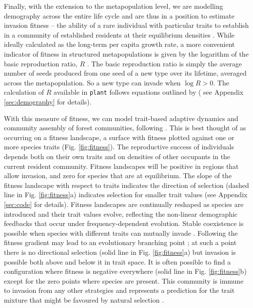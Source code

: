 \documentclass[a4paper,11pt]{article}
\newcommand{\plant}{\texttt{plant}}
\begin{document}
Finally, with the extension to the metapopulation level, we are
modelling demography across the entire life cycle and are thus in a
position to estimate invasion fitness -- the ability of a rare
individual with particular traits to establish in a community of
established residents at their equilibrium densities
\citep{Metz-1992, Chesson-2000}.  While ideally calculated as the
long-term per capita growth rate, a more convenient indicator of
fitness in structured metapopulations is given by the
logarithm of the basic reproduction ratio, \(R\) \citep{Gyllenberg-2001, Metz-2001}. The basic reproduction ratio is simply the average number of seeds produced from one seed of a new type over its lifetime, averaged across the metapopulation. So a new type can
invade when \(\log R > 0\). The calculation of \(R\) available in
{\plant} follows equations outlined by \citet{Falster-2015} (
see Appendix \ref{sec:demography} for details).

With this measure of fitness, we can model trait-based adaptive
dynamics and community assembly of forest communities, following
 \citep{Falster-2015}. This is best thought of as occurring on a fitness landscape, a surface with fitness plotted against one or more species traits
(Fig. \ref{fig:fitness}). The reproductive success of individuals
depends both on their own traits and on densities of other occupants in the current resident community. Fitness landscapes will be positive in regions that allow invasion, and zero
for species that are at equilibrium. The slope of the fitness
landscape with respect to traits indicates the direction of selection
(dashed line in Fig. \ref{fig:fitness}a) indicates selection for
smaller trait values (see Appendix \ref{sec:code} for
details). Fitness landscapes are continually reshaped as species are
introduced and their trait values evolve, reflecting the non-linear demographic feedbacks
that occur under frequency-dependent evolution. Stable coexistence is
possible when species with different traits can mutually invade
\citep{Geritz-1998, Chesson-2000}. Following the fitness gradient may lead to an
evolutionary branching point \citep{Geritz-1998}; at
such a point there is no directional selection (solid line in
Fig. \ref{fig:fitness}a) but invasion is possible both above and below
it in trait space. It is often possible to find a configuration where
fitness is negative everywhere (solid line in Fig. \ref{fig:fitness}b)
except for the zero points where species are present. This community
is immune to invasion from any other strategies and represents a
prediction for the trait mixture that might be favoured by
natural selection \citep{Geritz-1998}.
\end{document}
